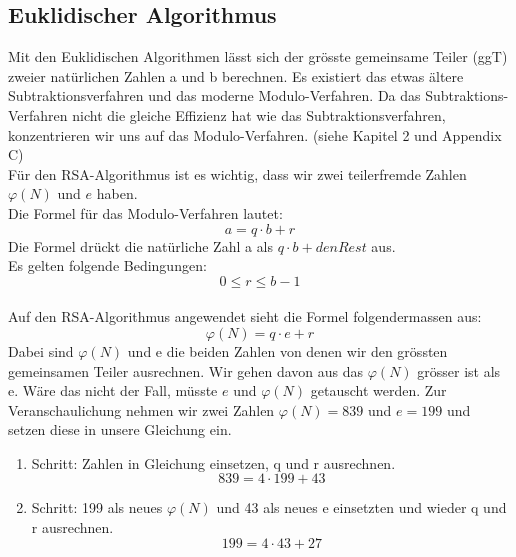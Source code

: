 \subsection{Euklidischer Algorithmus}\label{euklidischer_Algorithmus}
Mit den Euklidischen Algorithmen lässt sich der grösste gemeinsame Teiler (ggT) zweier natürlichen Zahlen a und b berechnen. Es existiert das etwas ältere Subtraktionsverfahren und das moderne Modulo-Verfahren. Da das Subtraktions-Verfahren nicht die gleiche Effizienz hat wie das Subtraktionsverfahren, konzentrieren wir uns auf das Modulo-Verfahren. (siehe \cite{zahlentheorie_fuer_einsteiger} Kapitel 2 und \cite{kryptographie} Appendix C)\\
Für den RSA-Algorithmus ist es wichtig, dass wir zwei teilerfremde Zahlen $\varphi(N)$ und $e$ haben.\\
%
Die Formel für das Modulo-Verfahren lautet:
%
\begin{equation}
  \label{eqn:euklidischer_algo}
  a = q \cdot b + r 
\end{equation}
%
Die Formel drückt die natürliche Zahl a als $ q \cdot b + den Rest $ aus. \\
Es gelten folgende Bedingungen:
\begin{equation*}
  0 \leq r \leq b - 1
\end{equation*}
\\
%
Auf den RSA-Algorithmus angewendet sieht die Formel folgendermassen aus:
\begin{equation}
  \label{eqn:euklidischer_algo_RSA}
  \varphi(N) = q \cdot e + r 
\end{equation}
%
Dabei sind $\varphi(N)$ und e die beiden Zahlen von denen wir den grössten gemeinsamen Teiler ausrechnen.
Wir gehen davon aus das $\varphi(N)$ grösser ist als e. Wäre das nicht der Fall, müsste $ e $ und $ \varphi(N) $  getauscht werden.
Zur Veranschaulichung nehmen wir zwei Zahlen $\varphi(N) = 839$ und $e = 199$ und setzen diese in unsere Gleichung ein.
\begin{enumerate}
  \item Schritt: Zahlen in Gleichung einsetzen, q und r ausrechnen.\\
    \begin{equation*}
      839 = 4 \cdot 199 + 43
    \end{equation*}
  \item Schritt: 199 als neues $\varphi(N)$ und 43 als neues e einsetzten und wieder q und r ausrechnen.\\
    \begin{equation*}
      199 = 4 \cdot 43 + 27
    \end{equation*}
\end{enumerate}
